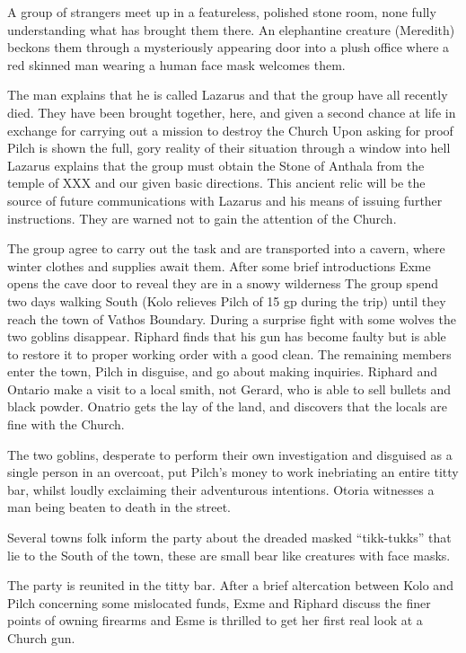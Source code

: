 A group of strangers meet up in a featureless, polished stone room, none fully understanding what has brought them there. An elephantine creature (Meredith) beckons them through a mysteriously appearing door into a plush office where a red skinned man wearing a human face mask welcomes them.\medskip

The man explains that he is called Lazarus and that the group have all recently died. They have been brought together, here, and given a second chance at life in exchange for carrying out a mission to destroy the Church Upon asking for proof Pilch is shown the full, gory reality of their situation through a window into hell Lazarus explains that the group must obtain the Stone of Anthala from the temple of XXX and our given basic directions. This ancient relic will be the source of future communications with Lazarus and his means of issuing further instructions. They are warned not to gain the attention of the Church.\medskip

The group agree to carry out the task and are transported into a cavern, where winter clothes and supplies await them. After some brief introductions Exme opens the cave door to reveal they are in a snowy wilderness The group spend two days walking South (Kolo relieves Pilch of 15 gp during the trip) until they reach the town of Vathos Boundary. During a surprise fight with some wolves the two goblins disappear. Riphard finds that his gun has become faulty but is able to restore it to proper working order with a good clean.\medskip
The remaining members enter the town, Pilch in disguise, and go about making inquiries. Riphard and Ontario make a visit to a local smith, not Gerard, who is able to sell bullets and black powder. Onatrio gets the lay of the land, and discovers that the locals are fine with the Church.\medskip

The two goblins, desperate to perform their own investigation and disguised as a single person in an overcoat, put Pilch’s money to work inebriating an entire titty bar, whilst loudly exclaiming their adventurous intentions. Otoria witnesses a man being beaten to death in the street.\medskip

Several towns folk inform the party about the dreaded masked “tikk-tukks” that lie to the South of the town, these are small bear like creatures with face masks.\medskip

The party is reunited in the titty bar. After a brief altercation between Kolo and Pilch concerning some mislocated funds, Exme and Riphard discuss the finer points of owning firearms and Esme is thrilled to get her first real look at a Church gun.\medskip

